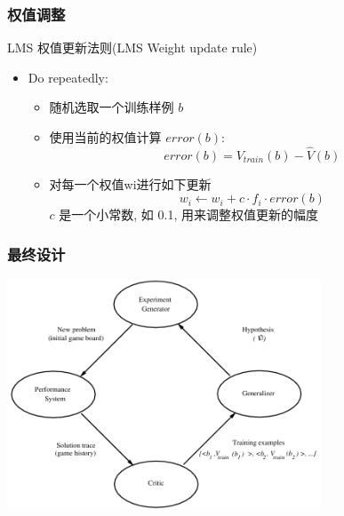 \documentclass{beamer}
\begin{document}
\begin{frame}
\frametitle{权值调整}
\label{sec-4-8}

LMS 权值更新法则(LMS Weight update rule)
\begin{itemize}
\item Do repeatedly:
\begin{itemize}
\item 随机选取一个训练样例 $b$
\item 使用当前的权值计算 $error(b)$:
         \[error(b) = V_{train}(b) - \hat{V}(b)\]
\item 对每一个权值wi进行如下更新
          \[w_{i} \leftarrow w_{i} + c \cdot f_{i} \cdot error(b) \]
      $c$ 是一个小常数, 如 0.1, 用来调整权值更新的幅度
\end{itemize}
\end{itemize}
\end{frame}
\begin{frame}
\frametitle{最终设计}
\label{sec-4-9}

\includegraphics[width=0.7\textwidth]{./image/intro-final-design.png}
\end{frame}
\end{document}
